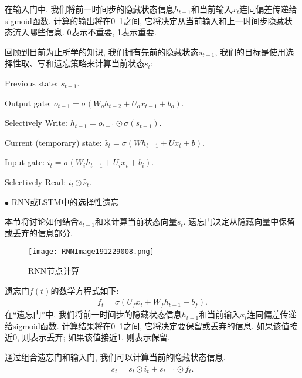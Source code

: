 \begin{example}
在输入门中, 我们将前一时间步的隐藏状态信息$h_{t-1}$和当前输入$x_t$连同偏差传递给sigmoid函数. 计算的输出将在0–1之间, 它将决定从当前输入和上一时间步隐藏状态流入哪些信息. 0表示不重要, 1表示重要.

回顾到目前为止所学的知识, 我们拥有先前的隐藏状态$s_{t-1}$, 我们的目标是使用选择性取、写和遗忘策略来计算当前状态$s_t$:

\quad Previous state: $s_{t-1}$.

\quad Output gate: $o_{t-1}=\sigma\left(W_{o} h_{t-2}+U_{o} x_{t-1}+b_{o}\right)$.

\quad Selectively Write: $h_{t-1}=o_{t-1} \odot \sigma\left(s_{t-1}\right)$.

\quad Current (temporary) state: $\tilde{s_{t}}=\sigma\left(W h_{t-1}+U x_{t}+b\right)$.

\quad Input gate: $i_{t}=\sigma\left(W_{i} h_{t-1}+U_{i} x_{t}+b_{i}\right)$.

\quad Selectively Read: $i_{t} \odot \tilde{s_{t}}$. 
\end{example}
$\bullet$ RNN或LSTM中的选择性遗忘

本节将讨论如何结合$s_{t-1}$和来计算当前状态向量$s_t$.
遗忘门决定从隐藏向量中保留或丢弃的信息部分.
\begin{figure}[H]
    \centering
    \texttt{[image: RNNImage191229008.png]}
    \caption{RNN节点计算}
    \label{RNNImage191229008}\vspace{-0.4cm}
\end{figure}

遗忘门$f(t)$的数学方程式如下:
\begin{align}
    f_{t}=\sigma\left(U_{f} x_{t}+W_{f} h_{t-1}+b_{f}\right).
\end{align}
在“遗忘门”中, 我们将前一时间步的隐藏状态信息$h_{t-1}$和当前输入$x_t$连同偏差传递给sigmoid函数. 
计算结果将在0–1之间, 它将决定要保留或丢弃的信息. 如果该值接近0, 则表示丢弃; 如果该值接近1, 则表示保留.

通过组合遗忘门和输入门, 我们可以计算当前的隐藏状态信息.
\begin{align}
    s_{t}=\tilde{s}_{t} \odot i_{t}+s_{t-1} \odot f_{t}.
\end{align}

